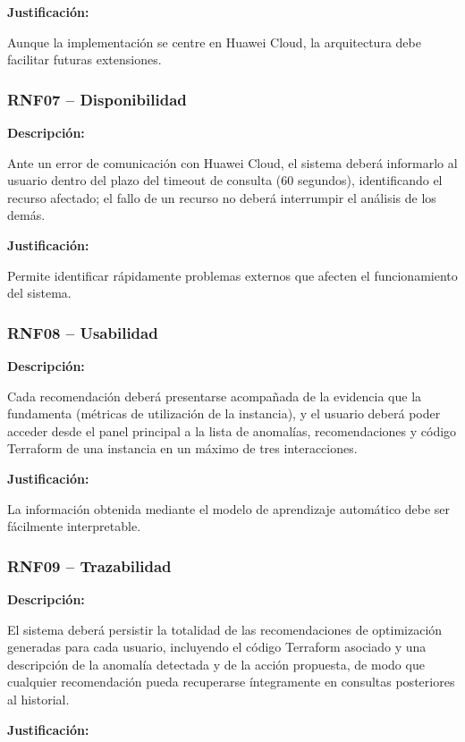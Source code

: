 \noindent \textbf{Justificación:}

Aunque la implementación se centre en Huawei Cloud, la arquitectura debe facilitar futuras extensiones.

\subsubsection{RNF07 -- Disponibilidad}

\noindent \textbf{Descripción:}

Ante un error de comunicación con Huawei Cloud, el sistema deberá informarlo al usuario dentro del plazo del timeout de consulta (60 segundos), identificando el recurso afectado; el fallo de un recurso no deberá interrumpir el análisis de los demás.

\noindent \textbf{Justificación:}

Permite identificar rápidamente problemas externos que afecten el funcionamiento del sistema.

\subsubsection{RNF08 -- Usabilidad}

\noindent \textbf{Descripción:}

Cada recomendación deberá presentarse acompañada de la evidencia que la fundamenta (métricas de utilización de la instancia), y el usuario deberá poder acceder desde el panel principal a la lista de anomalías, recomendaciones y código Terraform de una instancia en un máximo de tres interacciones.

\noindent \textbf{Justificación:}

La información obtenida mediante el modelo de aprendizaje automático debe ser fácilmente interpretable.

\subsubsection{RNF09 -- Trazabilidad}

\noindent \textbf{Descripción:}

El sistema deberá persistir la totalidad de las recomendaciones de optimización generadas para cada usuario, incluyendo el código Terraform asociado y una descripción de la anomalía detectada y de la acción propuesta, de modo que cualquier recomendación pueda recuperarse íntegramente en consultas posteriores al historial.

\noindent \textbf{Justificación:}

